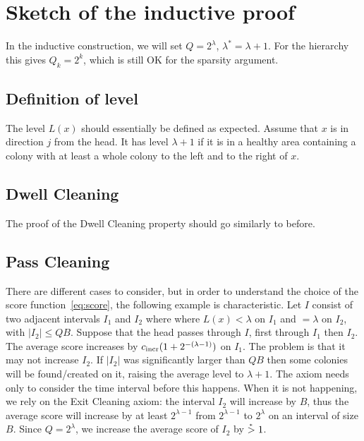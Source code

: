 \documentclass[12pt]{memoir}
\renewcommand{\le}{\leq}
\def\B{B}
\newcommand{\cns}[1]{c_{\textrm{\upshape #1}}}
\newcommand{\cIncr}{\cns{incr}}
\begin{document}
\section{Sketch of the inductive proof}

In the inductive construction, we will set \( Q=2^{\lambda} \), \( \lambda^{*}=\lambda+1 \).
For the hierarchy this gives \( Q_{k}=2^{k} \), which is still OK for the sparsity argument.

\subsection{Definition of level}

The level \( L(x) \) should essentially be defined as expected.
Assume that \( x \) is in direction \( j \) from the head.
It has level \( \lambda+1 \)
if it is in a healthy area containing a colony with at least a whole colony to the left and to the right
of \( x \).


\subsection{Dwell Cleaning}

The proof of the Dwell Cleaning property should go similarly to before.


\subsection{Pass Cleaning}

There are different cases  to consider, but in order to understand the choice of the
score function~\eqref{eq:score}, the following example is characteristic.
Let \( I \) consist of two adjacent intervals \( I_{1} \) and \(  I_{2} \) where  
where \( L(x)<\lambda \) on \( I_{1} \) and \( =\lambda \) on \( I_{2} \), with
\( |I_{2}|\le Q\B \).
Suppose that the head passes through \( I \), first through \( I_{1} \) then \( I_{2} \).
The average score increases by \( \cIncr(1+2^{-(\lambda-1)}) \) on \( I_{1} \).
The problem is that it may not increase \( I_{2} \).
If \( |I_{2}| \) was significantly larger than \( Q\B \) then some colonies will be
found/created on it, raising the average level to \( \lambda+1 \).
The axiom needs only to consider the time interval before this happens.
When it is not happening, we rely on the Exit Cleaning axiom: the interval \( I_{2} \)
will increase by \( \B \), thus the average score will increase by at least \( 2^{\lambda-1} \)
from \( 2^{\lambda-1} \) to \( 2^{\lambda} \) on an interval of size \( \B \).
Since \( Q=2^{\lambda} \), we increase the average score of \( I_{2} \) by \( \stackrel{{}_*}{>} 1 \).
\end{document}
